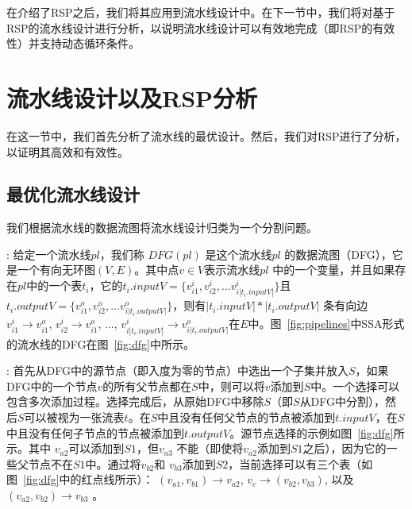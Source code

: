 \documentclass{ctexart}
\newcommand{\para}[1]{\smallskip\noindent {\bf #1}}
\begin{document}
在介绍了RSP之后，我们将其应用到流水线设计中。在下一节中，我们将对基于RSP的流水线设计进行分析，以说明流水线设计可以有效地完成（即RSP的有效性）并支持动态循环条件。



\section{流水线设计以及RSP分析}
\label{sec:analysis}

在这一节中，我们首先分析了流水线的最优设计。然后，我们对RSP进行了分析，以证明其高效和有效性。

\subsection{最优化流水线设计}
我们根据流水线的数据流图将流水线设计归类为一个分割问题。

\para{流水线数据流图}: 给定一个流水线$pl$，我们称 $DFG(pl)$ 是这个流水线$pl$ 的数据流图（DFG），它是一个有向无环图$(V, E)$。其中点$v \in V$表示流水线$pl$ 中的一个变量，并且如果存在$pl$中的一个表$t_i$，它的$t_i.inputV = \{v_{i1}^i, v_{i2}^i, ... v_{i|t_i.inputV|}^i\}$且$t_i.outputV = \{v_{i1}^o, v_{i2}^o, ... v_{i|t_i.outputV|}^o\}$，则有$|t_i.inputV| * |t_i.outputV|$ 条有向边 $v_{i1}^i \to v_{i1}^o$, $v_{i2}^i \to v_{i1}^o$, ..., $v_{i|t_i.inputV|}^i \to v_{i|t_i.outputV|}^o$在$E$中。图~\ref{fig:pipelines}中SSA形式的流水线的DFG在图~\ref{fig:dfg}中所示。

\para{源节点选择}: 首先从DFG中的源节点（即入度为零的节点）中选出一个子集并放入$S$，如果DFG中的一个节点$v$的所有父节点都在$S$中，则可以将$v$添加到$S$中。一个选择可以包含多次添加过程。选择完成后，从原始DFG中移除$S$（即$S$从DFG中分割），然后$S$可以被视为一张流表$t$。在$S$中且没有任何父节点的节点被添加到$t.inputV$，在$S$中且没有任何子节点的节点被添加到$t.outputV$。源节点选择的示例如图~\ref{fig:dfg}所示。其中 $v_{a2}$可以添加到$S1$，但$v_{a3}$ 不能（即使将$v_{a2}$添加到$S1$之后），因为它的一些父节点不在$S1$中。通过将$v_{b2}$和 $v_{b3}$添加到$S2$，当前选择可以有三个表（如图~\ref{fig:dfg}中的红点线所示）： $(v_{a1}, v_{b1}) \rightarrow v_{a2}$, $v_c \rightarrow (v_{b2}, v_{b3})$, 以及 $(v_{a2}, v_{b2}) \rightarrow v_{b3}$ 。
\end{document}
